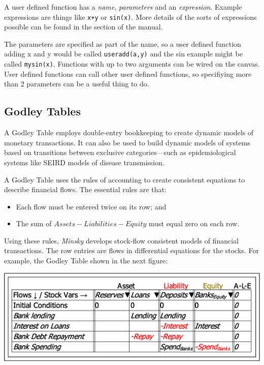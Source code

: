 A user defined function has a {\em name}, {\em parameters} and
an {\em expression}. Example expressions are things like \verb'x+y'
or \verb'sin(x)'. More details of the sorts of expressions possible
can be found in the 
section of the manual.

The parameters are specified as part of the name, so a user defined
function adding x and y would be called \verb'useradd(a,y)' and the
sin example might be called \verb'mysin(x)'. Functions with up to
two arguments can be wired on the canvas. User defined functions can
call other user defined functions, so specifiying more than 2 parameters
can be a useful thing to do.

\subsection{Godley Tables}

\label{godley}\label{GodleyIcon}

A Godley Table employs double-entry bookkeeping to create dynamic
models of monetary transactions. It can also be used to build dynamic
models of systems based on transitions between exclusive categories---such
as epidemiological systems like SEIRD models of disease transmission.

A Godley Table uses the rules of accounting to create consistent equations
to describe financial flows. The essential rules are that:
\begin{itemize}
\item Each flow must be entered twice on its row; and
\item The sum of $Assets-Liabilities-Equity$ must equal zero on each row.
\end{itemize}
Using these rules, \emph{Minsky} develops stock-flow consistent models
of financial transactions. The row entries are flows in differential
equations for the stocks. For example, the Godley Table shown in the
next figure:

\noindent\includegraphics[width=\textwidth]{images/GodleyTableImages}

